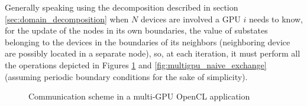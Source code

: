 Generally speaking using the decomposition described in section \ref{sec:domain_decomposition} when $N$ devices are involved a GPU $i$ needs to know, for the update of the nodes in its own boundaries, the value of substates belonging to the devices in the boundaries of its neighbors (neighboring device are possibly located in a separate node), so, at each iteration, it must perform all the operations depicted in Figures \ref{fig:communication_scheme} and \ref{fig:multigpu_naive_exchange} (assuming periodic boundary conditions for the sake of simplicity).
\begin{figure}[H]
\label{fig:communication_scheme}
\caption{Communication scheme in a multi-GPU OpenCL application}
\end{figure}


